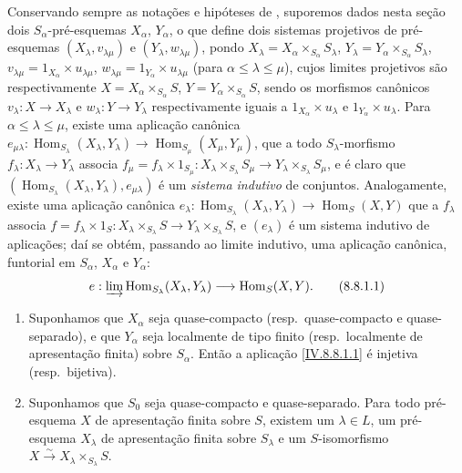 \begin{env}[8.8.1]
\label{IV.8.8.1}
Conservando sempre as notações e hipóteses de , suporemos dados nesta seção dois $S_\alpha$-pré-esquemas $X_\alpha$, $Y_\alpha$, o que define  dois sistemas projetivos de pré-esquemas $(X_\lambda,v_{\lambda\mu})$ e $(Y_\lambda,w_{\lambda\mu})$, pondo $X_\lambda=X_\alpha\times_{S_\alpha}S_\lambda$, $Y_\lambda=Y_\alpha\times_{S_\alpha}S_\lambda$, $v_{\lambda\mu}=1_{X_\alpha}\times u_{\lambda\mu}$, $w_{\lambda\mu}=1_{Y_\alpha}\times u_{\lambda\mu}$ (para $\alpha\leqslant\lambda\leqslant\mu$), cujos limites projetivos são respectivamente $X=X_\alpha\times_{S_\alpha}S$, $Y=Y_\alpha\times_{S_\alpha}S$, sendo os morfismos canônicos $v_\lambda:X\to X_\lambda$ e $w_\lambda:Y\to Y_\lambda$ respectivamente iguais a $1_{X_\alpha}\times u_\lambda$ e $1_{Y_\alpha}\times u_\lambda$.
Para $\alpha\leqslant\lambda\leqslant\mu$, existe uma aplicação canônica $e_{\mu\lambda}:\operatorname{Hom}_{S_\lambda}(X_\lambda,Y_\lambda)\to\operatorname{Hom}_{S_\mu}(X_\mu,Y_\mu)$, que a todo $S_\lambda$-morfismo $f_\lambda:X_\lambda\to Y_\lambda$ associa $f_\mu=f_\lambda\times 1_{S_\mu}:X_\lambda\times_{S_\lambda}S_\mu\to Y_\lambda\times_{S_\lambda}S_\mu$, e é claro que $(\operatorname{Hom}_{S_\lambda}(X_\lambda,Y_\lambda),e_{\mu\lambda})$ é um \emph{sistema indutivo} de conjuntos.
Analogamente, existe uma aplicação canônica $e_\lambda:\operatorname{Hom}_{S_\lambda}(X_\lambda,Y_\lambda)\to\operatorname{Hom}_S(X,Y)$ que a $f_\lambda$ associa $f=f_\lambda\times 1_S:X_\lambda\times_{S_\lambda}S\to Y_\lambda\times_{S_\lambda}S$, e $(e_\lambda)$ é um sistema indutivo de aplicações; daí se obtém, passando ao limite indutivo, uma aplicação canônica, funtorial em $S_\alpha$, $X_\alpha$ e $Y_\alpha$:
\[
  e:\varinjlim\operatorname{Hom}_{S_\lambda}(X_\lambda,Y_\lambda)\to\operatorname{Hom}_S(X,Y).
  \tag{8.8.1.1}\label{IV.8.8.1.1}
\]
\end{env}

\begin{theorem}[8.8.2]
\label{IV.8.8.2}
\begin{enumerate}[label=(\roman*)]
\item Suponhamos que $X_\alpha$ seja quase-compacto (resp.\ quase-compacto e quase-separado), e que $Y_\alpha$ seja localmente de tipo finito (resp.\ localmente de apresentação finita) sobre $S_\alpha$.
Então a aplicação \eqref{IV.8.8.1.1} é injetiva (resp.\ bijetiva).
\item Suponhamos que $S_0$ seja quase-compacto e quase-separado.
Para todo pré-esquema $X$ de apresentação finita sobre $S$, existem um $\lambda\in L$, um pré-esquema $X_\lambda$ de apresentação finita sobre $S_\lambda$ e um $S$-isomorfismo $X\xrightarrow{\sim}X_\lambda\times_{S_\lambda}S$.
\end{enumerate}
\end{theorem}

